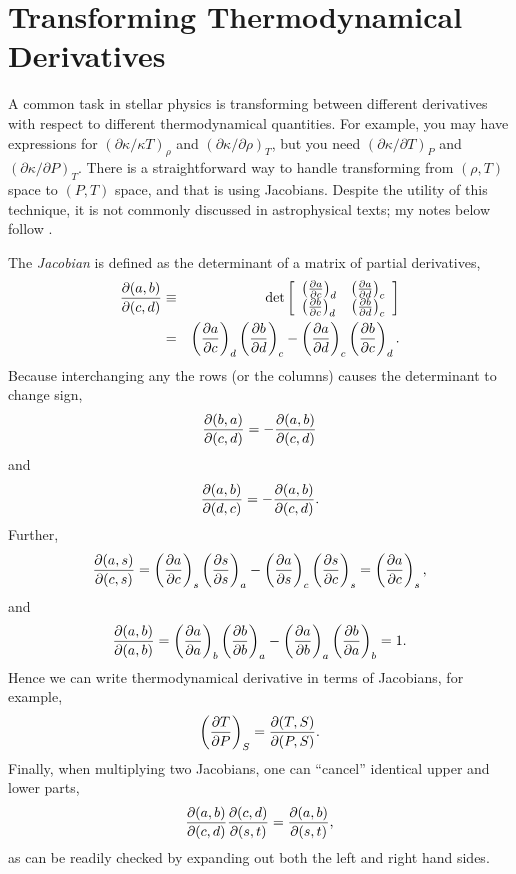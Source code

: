 \chapter[Thermodynamical Derivatives]{Transforming Thermodynamical Derivatives}
\label{s.thermo-derivatives}

A common task in stellar physics is transforming between different derivatives with respect to different thermodynamical quantities.  For example, you may have expressions for $(\partial \kappa/\kappa T)_{\rho}$ and $(\partial \kappa/\partial \rho)_{T}$, but you need $(\partial\kappa/\partial T)_{P}$ and $(\partial\kappa/\partial P)_{T}$.  There is a straightforward way to handle transforming from $(\rho,T)$ space to $(P,T)$ space, and that is using Jacobians.  Despite the utility of this technique, it is not commonly discussed in astrophysical texts; my notes below follow \citet{landau80:_statis_physic}.

The \emph{Jacobian} is defined as the determinant of a matrix of partial derivatives,
\begin{eqnarray}
\frac{\partial(a,b)}{\partial(c,d)} &\equiv& \det\left[
	\begin{array}{lr}\left(\frac{\partial a}{\partial c}\right)_{d} & \left(\frac{\partial a}{\partial d}\right)_{c}\\
	\left(\frac{\partial b}{\partial c}\right)_{d} & \left(\frac{\partial b}{\partial d}\right)_{c} \end{array}\right] \nonumber \\
 & = & \left(\frac{\partial a}{\partial c}\right)_{d}\left(\frac{\partial b}{\partial d}\right)_{c} - \left(\frac{\partial a}{\partial d}\right)_{c}\left(\frac{\partial b}{\partial c}\right)_{d}.
 \end{eqnarray}
Because interchanging any the rows (or the columns) causes the determinant to change sign, 
\begin{equation}
\frac{\partial(b,a)}{\partial(c,d)} = -\frac{\partial(a,b)}{\partial(c,d)}
\end{equation}
and
\begin{equation}
\frac{\partial(a,b)}{\partial(d,c)} = -\frac{\partial(a,b)}{\partial(c,d)}.
\end{equation}
Further,
\begin{equation}
\frac{\partial(a,s)}{\partial(c,s)} = \left(\frac{\partial a}{\partial c}\right)_{s}\left(\frac{\partial s}{\partial s}\right)_{a} - \left(\frac{\partial a}{\partial s}\right)_{c}\left(\frac{\partial s}{\partial c}\right)_{s} = \left(\frac{\partial a}{\partial c}\right)_{s},
\end{equation}
and
\begin{equation}
\frac{\partial(a,b)}{\partial(a,b)} = \left(\frac{\partial a}{\partial a}\right)_{b}\left(\frac{\partial b}{\partial b}\right)_{a} - \left(\frac{\partial a}{\partial b}\right)_{a}\left(\frac{\partial b}{\partial a}\right)_{b} = 1.
\end{equation}
Hence we can write thermodynamical derivative in terms of Jacobians, for example,
\begin{equation}
\left(\frac{\partial T}{\partial P}\right)_{S} = \frac{\partial(T,S)}{\partial(P,S)}.
\end{equation}
Finally, when multiplying two Jacobians, one can ``cancel'' identical upper and lower parts,
\begin{equation}
\frac{\partial(a,b)}{\partial(c,d)}\frac{\partial(c,d)}{\partial(s,t)} =\frac{\partial(a,b)}{\partial(s,t)},
\end{equation}
as can be readily checked by expanding out both the left and right hand sides.

